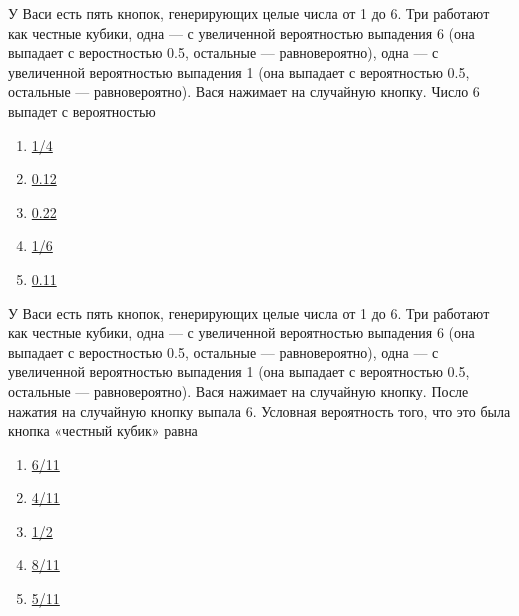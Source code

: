 \documentclass[t]{beamer}
\begin{document}
 \begin{frame} \label{14} 
\begin{block}{14} 

У Васи есть пять кнопок, генерирующих целые числа от 1 до 6. Три работают как честные кубики, одна — с увеличенной вероятностью выпадения 6 (она выпадает с веростностью 0.5, остальные — равновероятно), одна — с увеличенной вероятностью выпадения 1 (она выпадает с вероятностью 0.5, остальные — равновероятно). Вася нажимает на случайную кнопку. Число 6 выпадет с вероятностью
  


 \end{block} 
\begin{enumerate} 
\item[] \hyperlink{14-No}{\beamergotobutton{}  1/4 }
\item[] \hyperlink{14-No}{\beamergotobutton{}  0.12 }
\item[] \hyperlink{14-Yes}{\beamergotobutton{}  0.22 }
\item[] \hyperlink{14-No}{\beamergotobutton{}  1/6 }
\item[] \hyperlink{14-No}{\beamergotobutton{}  0.11 }
\end{enumerate} 
\end{frame} 


 \begin{frame} \label{15} 
\begin{block}{15} 

У Васи есть пять кнопок, генерирующих целые числа от 1 до 6. Три работают как честные кубики, одна — с увеличенной вероятностью выпадения 6 (она выпадает с веростностью 0.5, остальные — равновероятно), одна — с увеличенной вероятностью выпадения 1 (она выпадает с вероятностью 0.5, остальные — равновероятно). Вася нажимает на случайную кнопку. После нажатия на случайную кнопку выпала 6. Условная вероятность того, что это была кнопка «честный кубик» равна


 \end{block} 
\begin{enumerate} 
\item[] \hyperlink{15-No}{\beamergotobutton{}  6/11 }
\item[] \hyperlink{15-No}{\beamergotobutton{}  4/11 }
\item[] \hyperlink{15-No}{\beamergotobutton{}  1/2 }
\item[] \hyperlink{15-No}{\beamergotobutton{}  8/11 }
\item[] \hyperlink{15-Yes}{\beamergotobutton{}  5/11 }
\end{enumerate} 
\end{frame} 
\end{document}
